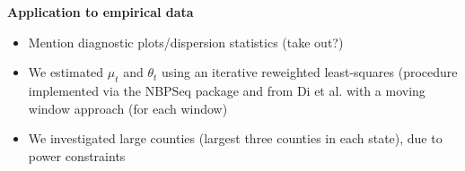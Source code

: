 \documentclass{beamer}
\begin{document}
\begin{frame}{\textbf{Application to empirical data}}
	\begin{itemize}[<+-| alert@+>]
		\item Mention diagnostic plots/dispersion statistics (take out?)
		\item We estimated \begin{math}\mu_t\end{math} and \begin{math}\theta_t\end{math} using an iterative reweighted least-squares (procedure implemented via the NBPSeq package\cite{NBPSeq} and from Di et al.\cite{yanming_nbp_2011} with a moving window approach (for each window)
		\item We investigated large counties (largest three counties in each state), due to power constraints
	\end{itemize}
\end{frame}
\end{document}

